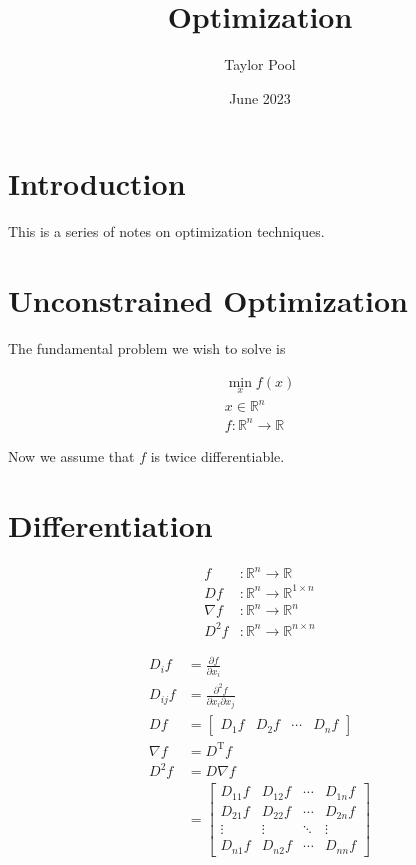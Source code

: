 \documentclass{article}
\title{Optimization}
\author{Taylor Pool}
\date{June 2023}
\begin{document}
\maketitle

\section{Introduction}

This is a series of notes on optimization techniques.

\section{Unconstrained Optimization}

The fundamental problem we wish to solve is 

\begin{align}
    \min_x f(x) \\
    x \in \mathbb{R}^n \\
    f : \mathbb{R}^n \rightarrow \mathbb{R}
\end{align}

Now we assume that $f$ is twice differentiable.

\section{Differentiation}

\begin{align}
    f &: \mathbb{R}^n \rightarrow \mathbb{R} \\
    Df &: \mathbb{R}^n \rightarrow \mathbb{R}^{1 \times n} \\
    \nabla f &: \mathbb{R}^n \rightarrow \mathbb{R}^n \\
    D^2 f &: \mathbb{R}^n \rightarrow \mathbb{R}^{n \times n}
\end{align}

\begin{align}
    D_i f &= \frac{\partial f}{\partial x_i} \\
    D_{ij} f &= \frac{\partial^2 f}{\partial x_i \partial x_j} \\
    Df &= \begin{bmatrix}
        D_1 f & D_2 f & \cdots & D_n f
    \end{bmatrix} \\
    \nabla f &= D^\mathrm{T} f \\
    D^2 f &= D \nabla f \\
    &= \begin{bmatrix}
        D_{11} f & D_{12} f & \cdots & D_{1n} f \\
        D_{21} f & D_{22} f & \cdots & D_{2n} f \\
        \vdots & \vdots & \ddots & \vdots \\
        D_{n1} f & D_{n2} f & \cdots & D_{nn} f
    \end{bmatrix}
\end{align}
\end{document}
